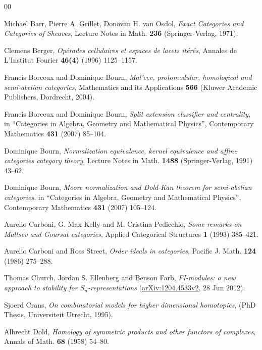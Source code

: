 \documentclass[a4paper,12pt,reqno]{amsart}
\theoremstyle{definition}
\theoremstyle{fact}
\theoremstyle{genquest}
\theoremstyle{step}
\begin{document}
\begin{thebibliography}{00}

 Michael Barr, Pierre A. Grillet, Donovan H. van Osdol, \textit{Exact Categories and Categories of Sheaves}, Lecture Notes in Math. \textbf{236} 
(Springer-Verlag, 1971).

 Clemens Berger, \textit{Op\'erades cellulaires et espaces de lacets it\'er\'es}, Annales de L'Institut Fourier \textbf{46(4)} (1996) 1125--1157.\label{Berger1996} 

 Francis Borceux and Dominique Bourn, \textit{Mal'cev, protomodular, homological and semi-abelian categories}, Mathematics and its Applications \textbf{566} (Kluwer Academic Publishers, Dordrecht, 2004).

 Francis Borceux and Dominique Bourn, \textit{Split extension classifier and centrality}, in ``Categories in Algebra, Geometry and Mathematical Physics'', 
Contemporary Mathematics \textbf{431} (2007) 85--104.\label{BorBou07}

 Dominique Bourn, \textit{Normalization equivalence, kernel equivalence and affine categories category theory}, Lecture Notes in Math. \textbf{1488} (Springer-Verlag, 1991) 43--62.\label{Bourn91}

 Dominique Bourn, \textit{Moore normalization and Dold-Kan theorem for semi-abelian categories}, 
in ``Categories in Algebra, Geometry and Mathematical Physics'', 
Contemporary Mathematics \textbf{431} (2007) 105--124.\label{Bourn07}

 Aurelio Carboni, G. Max Kelly and M. Cristina Pedicchio, \textit{Some remarks on Maltsev and Goursat categories}, Applied Categorical Structures \textbf{1} (1993) 385--421.\label{CKP93}

 Aurelio Carboni and Ross Street, \textit{Order ideals in categories}, 
Pacific J. Math. \textbf{124} (1986) 275--288.\label{CarSt86}

 Thomas Church, Jordan S. Ellenberg and Benson Farb, \textit{FI-modules: a new approach to stability for $S_n$-representations} (\url{arXiv:1204.4533v2}, 28 Jun 2012).\label{CEF2012}

 Sjoerd Crans, \textit{On combinatorial models for higher dimensional homotopies}, (PhD Thesis, Universiteit Utrecht, 1995).\label{CransThesis}

 Albrecht Dold, \textit{Homology of symmetric products and other functors of complexes}, Annals of Math. \textbf{68} (1958) 54--80.\label{Dold}
 

\end{thebibliography}
\end{document}
